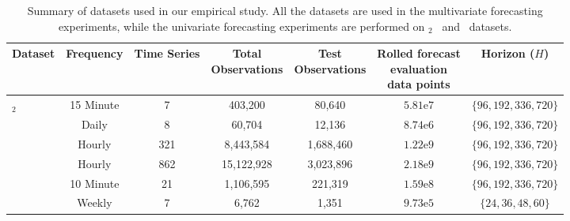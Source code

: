 \begin{table}[!ht]
\scriptsize
	\begin{center}
    \caption{Summary of datasets used in our empirical study. 
    All the datasets are used in the multivariate forecasting experiments, while the univariate forecasting experiments are performed on \ETTm$_{2}$ \ and \Exchange \ datasets.
    }

    \label{table:datasets_summary}
	\begin{sc}
		\begin{tabular}{lcccccc}
			\toprule
			Dataset     & Frequency & Time Series  & \thead{Total \\ Observations}    & \thead{Test \\ Observations} & \thead{Rolled forecast \\ evaluation \\ data points} & Horizon ($H$) \\
			\midrule
			\ETTm$_{2}$  & 15 Minute & 7       & 403,200     & 80,640     & $5.81\mathrm{e}7$ & $\{96,192,336,720\}$ \\
			\Exchange    & Daily     & 8       & 60,704      & 12,136     & $8.74\mathrm{e}6$ & $\{96,192,336,720\}$ \\ 
			\Electricity & Hourly    & 321     & 8,443,584   & 1,688,460  & $1.22\mathrm{e}{9}$ & $\{96,192,336,720\}$ \\
			\TrafficL    & Hourly    & 862     & 15,122,928  & 3,023,896  & $2.18\mathrm{e}{9}$ & $\{96,192,336,720\}$ \\
			\Weather     & 10 Minute & 21      & 1,106,595   & 221,319    & $1.59\mathrm{e}{8}$ & $\{96,192,336,720\}$ \\
			\ILI         & Weekly    & 7       & 6,762       & 1,351      & $9.73\mathrm{e}5$ & $\{24,36,48,60\}$    \\
			\bottomrule
		\end{tabular}
	\end{sc}
	\end{center}
	\vskip -0.1in
\end{table}